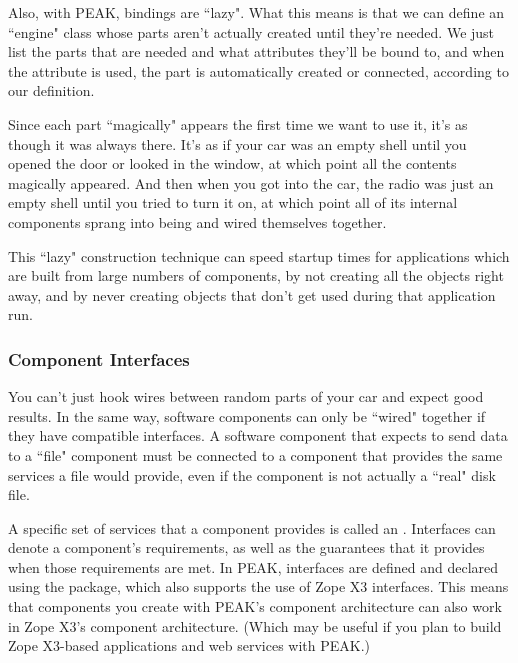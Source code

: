 Also, with PEAK, bindings are ``lazy".  What this means is that we can define
an ``engine" class whose parts aren't actually created until they're needed.
We just list the parts that are needed and what attributes they'll be bound
to, and when the attribute is used, the part is automatically created or
connected, according to our definition.

Since each part ``magically" appears the first time we want to use it, it's
as though it was always there.  It's as if your car was an empty shell until
you opened the door or looked in the window, at which point all the contents
magically appeared.  And then when you got into the car, the radio was just
an empty shell until you tried to turn it on, at which point all of its
internal components sprang into being and wired themselves together.

This ``lazy" construction technique can speed startup times for applications
which are built from large numbers of components, by not creating all the
objects right away, and by never creating objects that don't get used during
that application run.










\subsubsection{Component Interfaces}

You can't just hook wires between random parts of your car and expect good
results.  In the same way, software components can only be ``wired" together
if they have compatible interfaces.  A software component that expects to
send data to a ``file" component must be connected to a component that
provides the same services a file would provide, even if the component is not
actually a ``real" disk file.

A specific set of services that a component provides is called an
.  Interfaces can denote a component's requirements, as well
as the guarantees that it provides when those requirements are met.  In PEAK,
interfaces are defined and declared using the  package,
which also supports the use of Zope X3 interfaces.  This means that components
you create with PEAK's component architecture can also work in Zope X3's
component architecture.  (Which may be useful if you plan to build Zope
X3-based applications and web services with PEAK.)

